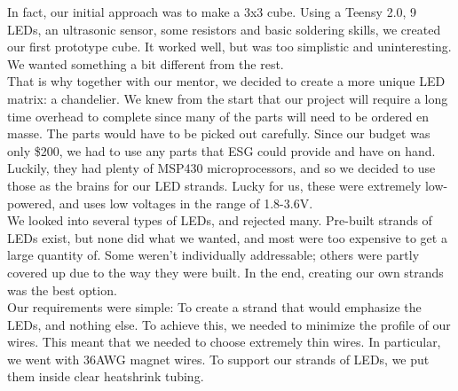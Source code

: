 \documentclass[10pt,titlepage]{article}
\begin{document}
  In fact, our initial approach was to make a 3x3 cube. Using a Teensy 2.0, 9 LEDs, an ultrasonic sensor, some resistors and basic soldering skills, we created our first prototype cube. It worked well, but was too simplistic and uninteresting. We wanted something a bit different from the rest. \\

  That is why together with our mentor, we decided to create a more unique LED matrix: a chandelier. We knew from the start that our project will require a long time overhead to complete since many of the parts will need to be ordered en masse. The parts would have to be picked out carefully. Since our budget was only \$200, we had to use any parts that ESG could provide and have on hand. Luckily, they had plenty of MSP430 microprocessors, and so we decided to use those as the brains for our LED strands. Lucky for us, these were extremely low-powered, and uses low voltages in the range of 1.8-3.6V. \\

  We looked into several types of LEDs, and rejected many. Pre-built strands of LEDs exist, but none did what we wanted, and most were too expensive to get a large quantity of. Some weren't individually addressable; others were partly covered up due to the way they were built. In the end, creating our own strands was the best option. \\

  Our requirements were simple: To create a strand that would emphasize the LEDs, and nothing else. To achieve this, we needed to minimize the profile of our wires. This meant that we needed to choose extremely thin wires. In particular, we went with 36AWG magnet wires. To support our strands of LEDs, we put them inside clear heatshrink tubing. \\
\end{document}
